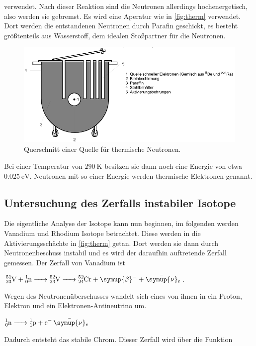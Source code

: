 verwendet.
Nach dieser Reaktion sind die Neutronen allerdings hochenergetisch, also werden sie gebremst.
Es wird eine Aperatur wie in \autoref{fig:therm} verwendet.
Dort werden die entstandenen Neutronen durch Parafin geschickt, es besteht größtenteils aus Wasserstoff, dem idealen Stoßpartner für die Neutronen.

\begin{figure}
    \centering
    \includegraphics[width=\textwidth]{images/bild1.png}
    \caption{Querschnitt einer Quelle für thermische Neutronen.}
    \label{fig:therm}
\end{figure}

Bei einer Temperatur von $\SI{290}{\kelvin}$ besitzen sie dann noch eine Energie von etwa $\SI{0.025}{\electronvolt}$.
Neutronen mit so einer Energie werden thermische Elektronen genannt.

\subsection{Untersuchung des Zerfalls instabiler Isotope}
\label{ssec:t4}

Die eigentliche Analyse der Isotope kann nun beginnen, im folgenden werden Vanadium und Rhodium Isotope betrachtet.
Diese werden in die Aktivierungsschächte in \autoref{fig:therm} getan.
Dort werden sie dann durch Neutronenbeschuss instabil und es wird der daraufhin auftretende Zerfall gemessen.
Der Zerfall von Vanadium ist

$\ce{^{51}_{23}V + ^{1}_0n -> ^{52}_{23}V -> ^{52}_{24}Cr + \symup{\beta}- + \bar{\symup{\nu}}_e}$.

Wegen des Neutronenüberschusses wandelt sich eines von ihnen in ein Proton, Elektron und ein Elektronen-Antineutrino um.

$\ce{^{1}_0n -> ^{1}_1p + e- \bar{\symup{\nu}}_e}$

Dadurch entsteht das stabile Chrom.
Dieser Zerfall wird über die Funktion 

